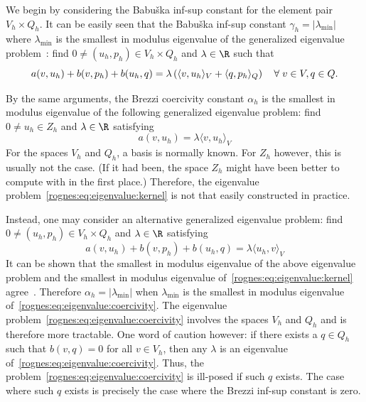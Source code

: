 We begin by considering the Babu\v ska inf-sup constant for the
element pair $V_h \times Q_h$. It can be easily seen that the Babu\v
ska inf-sup constant $\gamma_h = |\lambda_{\min}|$ where
$\lambda_{\min}$ is the smallest in modulus eigenvalue of the
generalized eigenvalue problem~\cite{ArnoldRognes2009, Malkus1981}:
find $0 \not = (u_h, p_h) \in V_h \times Q_h$ and $\lambda \in \R$
such that
\begin{equation}
  \label{rognes:eq:eigenvalue:babuska}
  a(v, u_h) + b(v, p_h) + b(u_h, q)
  = \lambda
  \left (\langle v, u_h \rangle_{V} + \langle q, p_h \rangle_{Q} \right )
  \quad \forall \; v \in V, q \in Q.
\end{equation}

By the same arguments, the Brezzi coercivity constant $\alpha_h$ is
the smallest in modulus eigenvalue of the following generalized
eigenvalue problem: find $0 \not = u_h \in Z_h$ and $\lambda \in \R$
satisfying
\begin{equation}
  \label{rognes:eq:eigenvalue:kernel}
  a(v, u_h) = \lambda \langle v, u_h \rangle_{V}
\end{equation}
For the spaces $V_h$ and $Q_h$, a basis is normally known. For $Z_h$
however, this is usually not the case. (If it had been, the space
$Z_h$ might have been better to compute with in the first place.)
Therefore, the eigenvalue problem~\eqref{rognes:eq:eigenvalue:kernel} is not
that easily constructed in practice.

Instead, one may consider an alternative generalized eigenvalue
problem: find $0 \not = (u_h, p_h) \in V_h \times Q_h$ and $\lambda
\in \R$ satisfying
\begin{equation}
  \label{rognes:eq:eigenvalue:coercivity}
  a(v, u_h) + b(v, p_h) + b(u_h, q) = \lambda \langle u_h, v \rangle_{V}
\end{equation}
It can be shown that the smallest in modulus eigenvalue of the above
eigenvalue problem and the smallest in modulus eigenvalue
of~\eqref{rognes:eq:eigenvalue:kernel}
agree~\cite{ArnoldRognes2009}. Therefore $\alpha_h = |\lambda_{\min}|$
when $\lambda_{\min}$ is the smallest in modulus eigenvalue
of~\eqref{rognes:eq:eigenvalue:coercivity}. The eigenvalue
problem~\eqref{rognes:eq:eigenvalue:coercivity} involves the spaces
$V_h$ and $Q_h$ and is therefore more tractable. One word of caution
however: if there exists a $q \in Q_h$ such that $b(v, q) = 0$ for all
$v \in V_h$, then any $\lambda$ is an eigenvalue
of~\eqref{rognes:eq:eigenvalue:coercivity}. Thus, the
problem~\eqref{rognes:eq:eigenvalue:coercivity} is ill-posed if such
$q$ exists. The case where such $q$ exists is precisely the case where
the Brezzi inf-sup constant is zero.

